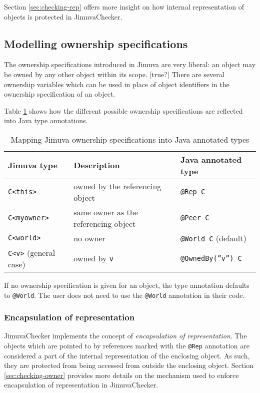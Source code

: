 \documentclass{pracamgr}
\theoremstyle{all}
\newcommand{\todo}[1]{{\color{red} [#1] }}
\begin{document}
Section \ref{sec:checking-rep} offers more insight on how internal
representation of objects is protected in JimuvaChecker. 


\subsection{Modelling ownership specifications}

The ownership specifications introduced in Jimuva are very liberal: an
object may be owned by any other object within its scope. \todo{true?}
There are several ownership variables which can be used in place of
object identifiers in the ownership specification of an object. 

Table \ref{tab:mapping-owner} shows how the different possible
ownership specifications are reflected into Java type annotations.
\begin{table}[htb]
  \centering
  \begin{tabular}{|l|l|l|}
    \hline
    \textbf{Jimuva type} & \textbf{Description} & \textbf{Java annotated type} \\
    \hline \hline 
    \texttt{C<this>} & owned by the referencing object & \texttt{@Rep C} \\
    \texttt{C<myowner>} & same owner as the referencing object & \texttt{@Peer C} \\
    \texttt{C<world>} & no owner & \texttt{@World C} (default) \\
    \texttt{C<v>} (general case) & owned by \texttt{v} & \texttt{@OwnedBy(''v'') C} \\
    \hline
  \end{tabular}
  \caption{Mapping Jimuva ownership specifications into Java annotated types}
  \label{tab:mapping-owner}
\end{table}
If no ownership specification is given for an object, the type
annotation defaults to \texttt{@World}. The user does not need to use
the \texttt{@World} annotation in their code.

\subsubsection{Encapsulation of representation}

JimuvaChecker implements the concept of \emph{encapsulation of
  representation}. The objects which are pointed to by references
marked with the \texttt{@Rep} annotation are considered a part of the
internal representation of the enclosing object. As such, they are
protected from being accessed from outside the enclosing
object. Section \ref{sec:checking-owner} provides more details on the
mechanism used to enforce encapsulation of representation in
JimuvaChecker. 
\end{document}
